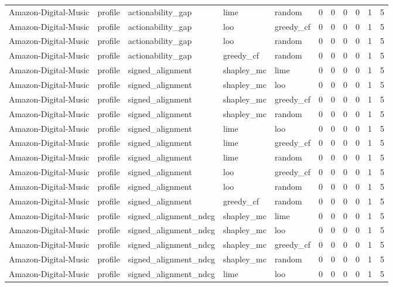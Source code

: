 \begin{table}[t]
{\begin{tabular}{lllllrrrrrr}
Amazon-Digital-Music & profile & actionability\_gap & lime & random & 0 & 0 & 0 & 0 & 1 & 5 \\
Amazon-Digital-Music & profile & actionability\_gap & loo & greedy\_cf & 0 & 0 & 0 & 0 & 1 & 5 \\
Amazon-Digital-Music & profile & actionability\_gap & loo & random & 0 & 0 & 0 & 0 & 1 & 5 \\
Amazon-Digital-Music & profile & actionability\_gap & greedy\_cf & random & 0 & 0 & 0 & 0 & 1 & 5 \\
Amazon-Digital-Music & profile & signed\_alignment & shapley\_mc & lime & 0 & 0 & 0 & 0 & 1 & 5 \\
Amazon-Digital-Music & profile & signed\_alignment & shapley\_mc & loo & 0 & 0 & 0 & 0 & 1 & 5 \\
Amazon-Digital-Music & profile & signed\_alignment & shapley\_mc & greedy\_cf & 0 & 0 & 0 & 0 & 1 & 5 \\
Amazon-Digital-Music & profile & signed\_alignment & shapley\_mc & random & 0 & 0 & 0 & 0 & 1 & 5 \\
Amazon-Digital-Music & profile & signed\_alignment & lime & loo & 0 & 0 & 0 & 0 & 1 & 5 \\
Amazon-Digital-Music & profile & signed\_alignment & lime & greedy\_cf & 0 & 0 & 0 & 0 & 1 & 5 \\
Amazon-Digital-Music & profile & signed\_alignment & lime & random & 0 & 0 & 0 & 0 & 1 & 5 \\
Amazon-Digital-Music & profile & signed\_alignment & loo & greedy\_cf & 0 & 0 & 0 & 0 & 1 & 5 \\
Amazon-Digital-Music & profile & signed\_alignment & loo & random & 0 & 0 & 0 & 0 & 1 & 5 \\
Amazon-Digital-Music & profile & signed\_alignment & greedy\_cf & random & 0 & 0 & 0 & 0 & 1 & 5 \\
Amazon-Digital-Music & profile & signed\_alignment\_ndcg & shapley\_mc & lime & 0 & 0 & 0 & 0 & 1 & 5 \\
Amazon-Digital-Music & profile & signed\_alignment\_ndcg & shapley\_mc & loo & 0 & 0 & 0 & 0 & 1 & 5 \\
Amazon-Digital-Music & profile & signed\_alignment\_ndcg & shapley\_mc & greedy\_cf & 0 & 0 & 0 & 0 & 1 & 5 \\
Amazon-Digital-Music & profile & signed\_alignment\_ndcg & shapley\_mc & random & 0 & 0 & 0 & 0 & 1 & 5 \\
Amazon-Digital-Music & profile & signed\_alignment\_ndcg & lime & loo & 0 & 0 & 0 & 0 & 1 & 5 \\

\end{tabular}}
\end{table}

